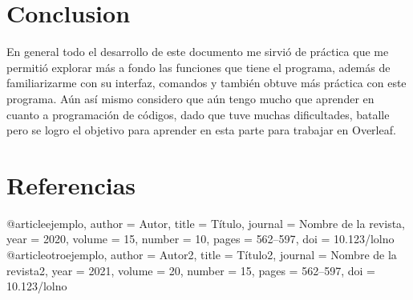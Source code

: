\documentclass{article}
\begin{document}
\section{Conclusion}

En general todo el desarrollo de este documento me sirvió de práctica que me permitió explorar más a fondo las funciones que tiene el programa, además de familiarizarme con su interfaz, comandos y también obtuve más práctica con este programa. Aún así mismo considero que aún tengo mucho que aprender en cuanto a programación de códigos, dado que tuve muchas dificultades, batalle pero se logro el objetivo para aprender en esta parte para trabajar en Overleaf.

\section{Referencias}

@article{ejemplo,
  author = {Autor},
  title = {T\'{i}tulo},
  journal = {Nombre de la revista},
  year = 2020,
  volume = 15,
  number = 10,
  pages = {562--597},
  doi = {10.123/lolno}
}
@article{otroejemplo,
  author = {Autor2},
  title = {T\'{i}tulo2},
  journal = {Nombre de la revista2},
  year = 2021,
  volume = 20,
  number = 15,
  pages = {562--597},
  doi = {10.123/lolno}
}



\end{document}
